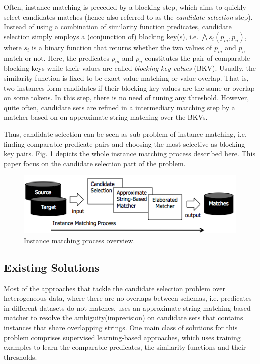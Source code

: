Often, instance matching is preceded by a blocking step, which aims to quickly select candidates matches (hence also referred to as the \emph{candidate selection} step). Instead of using a combination of similarity function predicates, candidate selection simply employs a (conjunction of) blocking key(s), i.e. $\bigwedge s_i(p_m,p_n)$, where $s_i$ is a binary function that returns whether the two values of $p_m$ and $p_n$ match or not. Here, the predicates $p_m$ and $p_n$ constitutes the pair of comparable blocking keys while their values are called \emph{blocking key values} (BKV). Usually, the similarity function is fixed to be exact value matching or value overlap. That is, two instances form candidates if their blocking key values are the same or overlap on some tokens. In this step, there is no need of tuning any threshold. However, quite often, candidate sets are refined in a intermediary matching step by a matcher based on on approximate string matching over the BKVs. 

Thus, candidate selection can be seen as sub-problem of instance matching, i.e. finding comparable predicate pairs and choosing the most selective as blocking key pairs. Fig. 1 depicts the whole instance matching process described here. This paper focus on the candidate selection part of the problem.

 \begin{figure} [ht]
 
\centering
\includegraphics[scale=0.5]{p1.png}
\caption{Instance matching process overview.} 
\vspace{-2pt}
\label{fig:space}
\end{figure}

 

\subsection{Existing Solutions} Most of the approaches that tackle the candidate selection problem over heterogeneous data, where there are no overlaps between schemas, i.e. predicates in different datasets do not matches, uses an approximate string matching-based matcher to resolve the ambiguity(imprecision) on candidate sets that contains instances that share overlapping strings. One main class of solutions for this problem comprises supervised learning-based approaches, which uses training examples to learn the comparable predicates, the similarity functions and their thresholds. 

